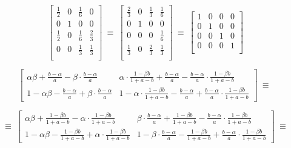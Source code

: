 $$
\left[
\begin{matrix}
	\frac12 & 0 & \frac16 & 0 \\
	0 		& 1 & 0       & 0 \\
	\frac12 & 0 & \frac16 & \frac23 \\
	0		& 0 & \frac13 & \frac13 \\
\end{matrix}
\right] \ \equiv \ \left[
\begin{matrix}
	\frac23 & 0 & \frac13 & \frac16 \\
	0 		& 1 & 0       & 0 \\
	0       & 0 & 0       & \frac16 \\
	\frac13	& 0 & \frac23 & \frac13 \\
\end{matrix}
\right] \ \equiv \ \left[
\begin{matrix}
	1 & 0 & 0 & 0 \\
	0 & 1 & 0 & 0 \\
	0 & 0 & 1 & 0 \\
	0 & 0 & 0 & 1 \\
\end{matrix}
\right]
$$





\vspace{0.5in}

$$
\left[
\begin{matrix}
	\alpha\beta + \frac{b-\alpha}{a} - \beta \cdot \frac{b-\alpha}{a} & 
	\alpha \cdot \frac{1-\beta b}{1+a-b} + \frac{b-\alpha}{a} - \frac{b-\alpha}{a} \cdot \frac{1-\beta b}{1 + a - b} \\
	1 - \alpha\beta - \frac{b-\alpha}{a} + \beta \cdot \frac{b-\alpha}{a} & 
	1 - \alpha \cdot \frac{1-\beta b}{1+a-b} - \frac{b-\alpha}{a} + \frac{b-\alpha}{a} \cdot \frac{1-\beta b}{1 + a - b}
\end{matrix}
\right]
\ \equiv \
$$

$$
\ \equiv \
\left[
\begin{matrix}
	\alpha\beta + \frac{1-\beta b}{1 + a - b} - \alpha \cdot \frac{1-\beta b}{1 + a - b} & 
	\beta \cdot \frac{b-\alpha}{a} + \frac{1-\beta b}{1+a-b} - \frac{b-\alpha}{a} \cdot \frac{1 - \beta b}{1 + a - b} \\
	1 - \alpha\beta - \frac{1-\beta b}{1 + a - b} + \alpha \cdot \frac{1-\beta b}{1 + a - b} & 
	1 - \beta \cdot \frac{b-\alpha}{a} - \frac{1-\beta b}{1+a-b} + \frac{b-\alpha}{a} \cdot \frac{1 - \beta b}{1 + a - b}
\end{matrix}
\right]
\ \equiv \
$$

